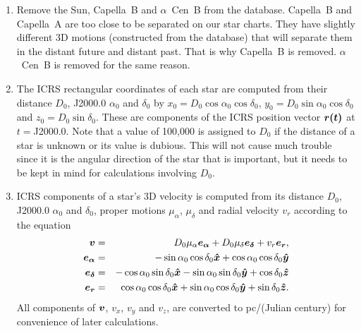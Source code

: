 \documentclass[12pt]{article}
\newcommand \beqn {\begin{eqnarray}}
\newcommand \eeqn {\end{eqnarray}}
\newcommand{\ve}[1]{\mbox{\boldmath $#1$}}
\begin{document}
\begin{enumerate}
\item Remove the Sun, Capella~B and $\alpha$~Cen~B from the database. 
Capella~B and Capella~A are too close to be separated on our star charts. 
They have slightly different 3D motions (constructed from the database) that 
will separate them in the distant future and distant past. That is why Capella~B 
is removed. $\alpha$~Cen~B is removed for the same reason. 

\item The ICRS rectangular coordinates of each star are computed from their 
distance $D_0$, J2000.0 $\alpha_0$ and $\delta_0$ by 
$x_0=D_0 \cos \alpha_0 \cos \delta_0$, $y_0=D_0\sin \alpha_0 \cos \delta_0$ and 
$z_0=D_0 \sin \delta_0$. These are components of the ICRS position vector 
$\ve{r(t)}$ at $t=$J2000.0. 
Note that a value of 100,000 is assigned to $D_0$ if the distance of 
a star is unknown or its value is dubious. This will not cause 
much trouble since it is the angular direction of the star that is  
important, but it needs to be kept in mind for calculations 
involving $D_0$.

\item ICRS components of a star's 3D velocity is computed 
from its distance $D_0$, J2000.0 $\alpha_0$ and $\delta_0$, proper 
motions $\mu_{\alpha}$, $\mu_{\delta}$ and radial velocity $v_r$ according 
to the equation 
\beqn
  \ve{v} &=& D_0 \mu_{\alpha} \ve{e_{\alpha}} + D_0\mu_{\delta} \ve{e_{\delta}}  
+ v_r \ve{e_r} , \\ 
  \ve{e_{\alpha}} &=& -\sin \alpha_0 \cos \delta_0 \ve{\hat{x}} + \cos \alpha_0 \cos \delta_0\ve{\hat{y}} \\ 
  \ve{e_{\delta}} &=& -\cos \alpha_0 \sin \delta_0 \ve{\hat{x}} 
-\sin \alpha_0 \sin \delta_0 \ve{\hat{y}} + \cos \delta_0 \ve{\hat{z}} \\ 
  \ve{e_r} &=& \cos \alpha_0 \cos \delta_0 \ve{\hat{x}} 
+ \sin \alpha_0 \cos \delta_0 \ve{\hat{y}} + \sin \delta_0 \ve{\hat{z}} .
\eeqn
All components of $\ve{v}$, $v_x$, $v_y$ and $v_z$, are converted 
to pc/(Julian century) for convenience of later calculations.


\end{enumerate}
\end{document}
